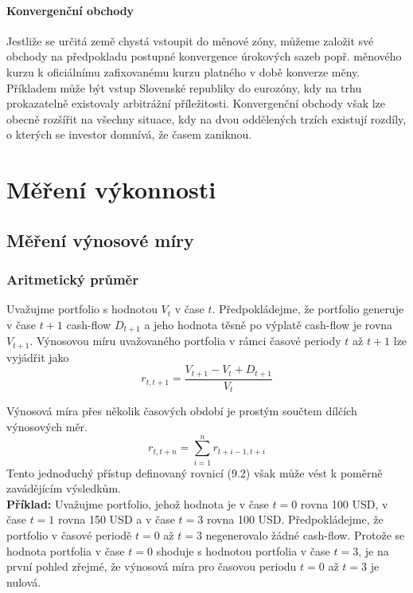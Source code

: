 \documentclass[a4paper]{book}
\begin{document}
\subsubsection{Konvergenční obchody}

Jestliže se určitá země chystá vstoupit do měnové zóny, můžeme založit své obchody na předpokladu postupné konvergence úrokových sazeb popř. měnového kurzu k oficiálnímu zafixovanému kurzu platného v době konverze měny. Příkladem může být vstup Slovenské republiky do eurozóny, kdy na trhu prokazatelně existovaly arbitrážní příležitosti. Konvergenční obchody však lze obecně rozšířit na všechny situace, kdy na dvou oddělených trzích existují rozdíly, o kterých se investor domnívá, že časem zaniknou.

\chapter{Měření výkonnosti}

\section{Měření výnosové míry}

\subsection{Aritmetický průměr}

Uvažujme portfolio s hodnotou $V_t$ v čase $t$. Předpokládejme, že portfolio generuje v čase $t+1$ cash-flow $D_{t+1}$ a jeho hodnota těsně po výplatě cash-flow je rovna $V_{t+1}$. Výnosovou míru uvažovaného portfolia v rámci časové periody $t$ až $t+1$ lze vyjádřit jako
\begin{equation}
r_{t,t+1} = \frac{V_{t+1} - V_t + D_{t+1}}{V_t}
\end{equation}

Výnosová míra přes několik časových období je prostým součtem dílčích výnosových měr.
\begin{equation}
r_{t, t + n} = \sum_{i=1}^n r_{t + i - 1, t + i}
\end{equation}
Tento jednoduchý přístup definovaný rovnicí (9.2) však může vést k poměrně zavádějícím výsledkům.\\

\noindent \textbf{Příklad:} Uvažujme portfolio, jehož hodnota je v čase $t = 0$ rovna 100 USD, v čase $t = 1$ rovna 150 USD a v čase $t = 3$  rovna 100 USD. Předpokládejme, že portfolio v časové periodě $t = 0$ až $t=3$ negenerovalo žádné cash-flow.
Protože se hodnota portfolia v čase $t=0$ shoduje s hodnotou portfolia v čase $t=3$, je na první pohled zřejmé, že výnosová míra pro časovou periodu $t=0$ až $t=3$ je nulová.
\end{document}
